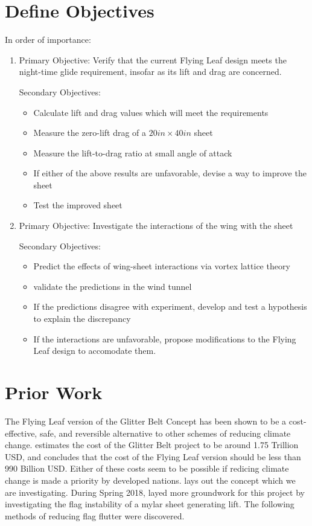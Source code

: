 \documentclass[12pt]{report} %
\begin{document}
\chapter{Define Objectives}
In order of importance:

\begin{enumerate}

\item Primary Objective: Verify that the current Flying Leaf design meets the night-time glide requirement, insofar as its lift and
drag are concerned.

	Secondary Objectives:
	\begin{itemize}
	\item Calculate lift and drag values which will meet the requirements
	\item Measure the zero-lift drag of a $20 in \times 40 in$ sheet
	\item Measure the lift-to-drag ratio at small angle of attack
	\item If either of the above results are unfavorable, devise a way to improve the sheet
	\item Test the improved sheet
	\end{itemize}

\item Primary Objective: Investigate the interactions of the wing with the sheet
	
	Secondary Objectives:
	\begin{itemize}
	\item Predict the effects of wing-sheet interactions via vortex lattice theory
	\item validate the predictions in the wind tunnel
	\item If the predictions disagree with experiment, develop and test a hypothesis to explain the discrepancy
	\item If the interactions are unfavorable, propose modifications to the Flying Leaf design to accomodate them.
	\end{itemize}

\end{enumerate}

\chapter{Prior Work}
The Flying Leaf version of the Glitter
Belt Concept has been shown to be a cost-effective, safe, and reversible alternative to other schemes of reducing
climate change. \cite{tradeoff} estimates the cost of the Glitter Belt project to be around 1.75 Trillion USD, and
\cite{flyingCarpet} concludes that the cost of the Flying Leaf version should be less than 990 Billion USD. Either
of these costs seem to be possible if redicing climate change is made a priority by developed nations. \cite{flyingCarpet}
lays out the concept which we are investigating.
During Spring 2018, \cite{us} layed more groundwork for this project by investigating the flag instability of a mylar sheet
generating lift. The following methods of reducing flag flutter were discovered.
\end{document}
